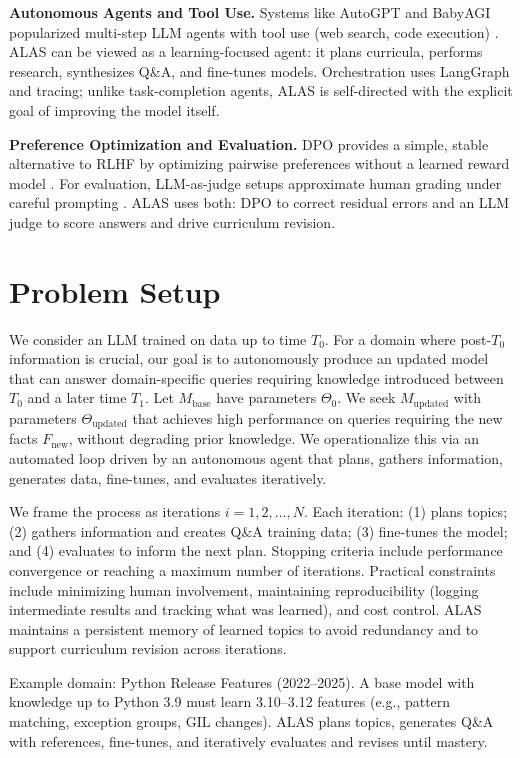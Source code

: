 \documentclass[11pt]{article}
\begin{document}
\textbf{Autonomous Agents and Tool Use.} Systems like AutoGPT and BabyAGI popularized multi-step LLM agents with tool use (web search, code execution) \citep{autogpt2023,babyagi2023}. ALAS can be viewed as a learning-focused agent: it plans curricula, performs research, synthesizes Q\&A, and fine-tunes models. Orchestration uses LangGraph and tracing; unlike task-completion agents, ALAS is self-directed with the explicit goal of improving the model itself.

\textbf{Preference Optimization and Evaluation.} DPO provides a simple, stable alternative to RLHF by optimizing pairwise preferences without a learned reward model \citep{rafailov2023dpo}. For evaluation, LLM-as-judge setups approximate human grading under careful prompting \citep{zheng2023judge}. ALAS uses both: DPO to correct residual errors and an LLM judge to score answers and drive curriculum revision.

\section{Problem Setup}
We consider an LLM trained on data up to time \(T_0\). For a domain where post-\(T_0\) information is crucial, our goal is to autonomously produce an updated model that can answer domain-specific queries requiring knowledge introduced between \(T_0\) and a later time \(T_1\). Let \(M_{\text{base}}\) have parameters \(\Theta_0\). We seek \(M_{\text{updated}}\) with parameters \(\Theta_{\text{updated}}\) that achieves high performance on queries requiring the new facts \(F_{\text{new}}\), without degrading prior knowledge. We operationalize this via an automated loop driven by an autonomous agent that plans, gathers information, generates data, fine-tunes, and evaluates iteratively.

We frame the process as iterations \(i = 1,2,\dots,N\). Each iteration: (1) plans topics; (2) gathers information and creates Q\&A training data; (3) fine-tunes the model; and (4) evaluates to inform the next plan. Stopping criteria include performance convergence or reaching a maximum number of iterations. Practical constraints include minimizing human involvement, maintaining reproducibility (logging intermediate results and tracking what was learned), and cost control. ALAS maintains a persistent memory of learned topics to avoid redundancy and to support curriculum revision across iterations.

Example domain: Python Release Features (2022--2025). A base model with knowledge up to Python 3.9 must learn 3.10--3.12 features (e.g., pattern matching, exception groups, GIL changes). ALAS plans topics, generates Q\&A with references, fine-tunes, and iteratively evaluates and revises until mastery.
\end{document}
